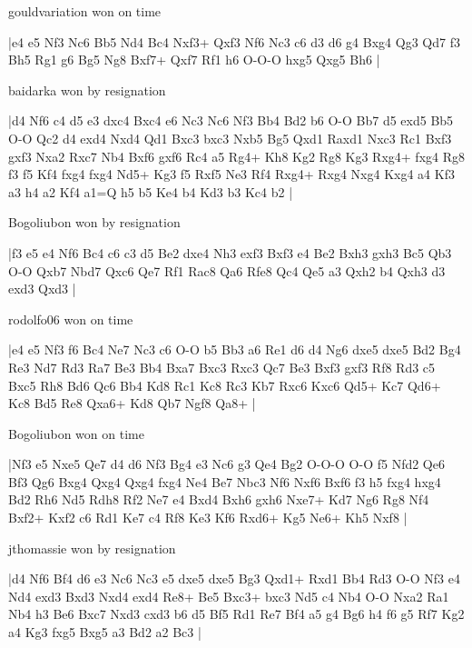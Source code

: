 \showboard

gouldvariation won on time

\makegametitle
|e4 e5 Nf3 Nc6 Bb5 Nd4 Bc4 Nxf3+ Qxf3 Nf6 Nc3 c6 d3 d6 g4 Bxg4 Qg3 Qd7 f3 Bh5 Rg1 g6 Bg5 Ng8 Bxf7+ Qxf7 Rf1 h6 O-O-O hxg5 Qxg5 Bh6  |

\showboard

baidarka won by resignation

\makegametitle
|d4 Nf6 c4 d5 e3 dxc4 Bxc4 e6 Nc3 Nc6 Nf3 Bb4 Bd2 b6 O-O Bb7 d5 exd5 Bb5 O-O Qc2 d4 exd4 Nxd4 Qd1 Bxc3 bxc3 Nxb5 Bg5 Qxd1 Raxd1 Nxc3 Rc1 Bxf3 gxf3 Nxa2 Rxc7 Nb4 Bxf6 gxf6 Rc4 a5 Rg4+ Kh8 Kg2 Rg8 Kg3 Rxg4+ fxg4 Rg8 f3 f5 Kf4 fxg4 fxg4 Nd5+ Kg3 f5 Rxf5 Ne3 Rf4 Rxg4+ Rxg4 Nxg4 Kxg4 a4 Kf3 a3 h4 a2 Kf4 a1=Q h5 b5 Ke4 b4 Kd3 b3 Kc4 b2  |

\showboard

Bogoliubon won by resignation

\makegametitle
|f3 e5 e4 Nf6 Bc4 c6 c3 d5 Be2 dxe4 Nh3 exf3 Bxf3 e4 Be2 Bxh3 gxh3 Bc5 Qb3 O-O Qxb7 Nbd7 Qxc6 Qe7 Rf1 Rac8 Qa6 Rfe8 Qc4 Qe5 a3 Qxh2 b4 Qxh3 d3 exd3 Qxd3  |

\showboard

rodolfo06 won on time

\makegametitle
|e4 e5 Nf3 f6 Bc4 Ne7 Nc3 c6 O-O b5 Bb3 a6 Re1 d6 d4 Ng6 dxe5 dxe5 Bd2 Bg4 Re3 Nd7 Rd3 Ra7 Be3 Bb4 Bxa7 Bxc3 Rxc3 Qc7 Be3 Bxf3 gxf3 Rf8 Rd3 c5 Bxc5 Rh8 Bd6 Qc6 Bb4 Kd8 Rc1 Kc8 Rc3 Kb7 Rxc6 Kxc6 Qd5+ Kc7 Qd6+ Kc8 Bd5 Re8 Qxa6+ Kd8 Qb7 Ngf8 Qa8+  |

\showboard

Bogoliubon won on time

\makegametitle
|Nf3 e5 Nxe5 Qe7 d4 d6 Nf3 Bg4 e3 Nc6 g3 Qe4 Bg2 O-O-O O-O f5 Nfd2 Qe6 Bf3 Qg6 Bxg4 Qxg4 Qxg4 fxg4 Ne4 Be7 Nbc3 Nf6 Nxf6 Bxf6 f3 h5 fxg4 hxg4 Bd2 Rh6 Nd5 Rdh8 Rf2 Ne7 e4 Bxd4 Bxh6 gxh6 Nxe7+ Kd7 Ng6 Rg8 Nf4 Bxf2+ Kxf2 c6 Rd1 Ke7 c4 Rf8 Ke3 Kf6 Rxd6+ Kg5 Ne6+ Kh5 Nxf8  |

\showboard

jthomassie won by resignation

\makegametitle
|d4 Nf6 Bf4 d6 e3 Nc6 Nc3 e5 dxe5 dxe5 Bg3 Qxd1+ Rxd1 Bb4 Rd3 O-O Nf3 e4 Nd4 exd3 Bxd3 Nxd4 exd4 Re8+ Be5 Bxc3+ bxc3 Nd5 c4 Nb4 O-O Nxa2 Ra1 Nb4 h3 Be6 Bxc7 Nxd3 cxd3 b6 d5 Bf5 Rd1 Re7 Bf4 a5 g4 Bg6 h4 f6 g5 Rf7 Kg2 a4 Kg3 fxg5 Bxg5 a3 Bd2 a2 Bc3  |

